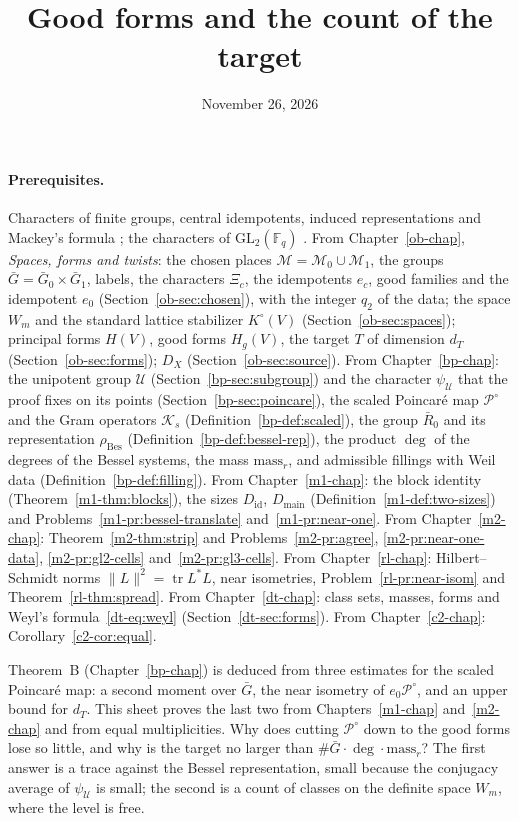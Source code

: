 \documentclass[reqno]{amsart}
\title{Good forms and the count of the target}
\author{}
\date{November 26, 2026}
\newcounter{chap}
\theoremstyle{plain}
\theoremstyle{definition}
\theoremstyle{remark}
\newcommand{\F}{\mathbb{F}}
\newcommand{\Gb}{\bar G}
\newcommand{\Rb}{\bar R_0}
\newcommand{\Po}{{\mathcal P^\circ}}
\newcommand{\Kc}{\mathcal K}
\newcommand{\Uc}{\mathcal U}
\newcommand{\Mcal}{\mathcal M}
\newcommand{\rB}{\rho_{\mathrm{Bes}}}
\newcommand{\Did}{D_{\mathrm{id}}}
\newcommand{\Dmain}{D_{\mathrm{main}}}
\newcommand{\mass}{\mathrm{mass}_r}
\newcommand{\GL}{\mathrm{GL}}
\newcommand{\tr}{\operatorname{tr}}
\begin{document}
\maketitle
{}\label{chap}

\paragraph{Prerequisites.}
Characters of finite groups, central idempotents, induced representations and Mackey's formula \cite[\S\S2, 6, 7]{Se}; the characters of \(\GL_2(\F_q)\) \cite[\S5.2]{FH}.  From Chapter~\ref{ob-chap}, \emph{Spaces, forms and twists}: the chosen places \(\Mcal = \Mcal_0 \cup \Mcal_1\), the groups \(\Gb = \Gb_0 \times \Gb_1\), labels, the characters \(\Xi_c\), the idempotents \(e_c\), good families and the idempotent \(e_0\) (Section~\ref{ob-sec:chosen}), with the integer \(q_2\) of the data; the space \(W_m\) and the standard lattice stabilizer \(K^\circ(V)\) (Section~\ref{ob-sec:spaces}); principal forms \(H(V)\), good forms \(H_g(V)\), the target \(T\) of dimension \(d_T\) (Section~\ref{ob-sec:forms}); \(D_X\) (Section~\ref{ob-sec:source}).  From Chapter~\ref{bp-chap}: the unipotent group \(\Uc\) (Section~\ref{bp-sec:subgroup}) and the character \(\psi_{\Uc}\) that the proof fixes on its points (Section~\ref{bp-sec:poincare}), the scaled Poincar\'e map \(\Po\) and the Gram operators \(\Kc_s\) (Definition~\ref{bp-def:scaled}), the group \(\Rb\) and its representation \(\rB\) (Definition~\ref{bp-def:bessel-rep}), the product \(\deg\) of the degrees of the Bessel systems, the mass \(\mass\), and admissible fillings with Weil data (Definition~\ref{bp-def:filling}).  From Chapter~\ref{m1-chap}: the block identity (Theorem~\ref{m1-thm:blocks}), the sizes \(\Did\), \(\Dmain\) (Definition~\ref{m1-def:two-sizes}) and Problems~\ref{m1-pr:bessel-translate} and~\ref{m1-pr:near-one}.  From Chapter~\ref{m2-chap}: Theorem~\ref{m2-thm:strip} and Problems~\ref{m2-pr:agree}, \ref{m2-pr:near-one-data}, \ref{m2-pr:gl2-cells} and~\ref{m2-pr:gl3-cells}.  From Chapter~\ref{rl-chap}: Hilbert--Schmidt norms \(\lVert L\rVert^2 = \tr L^*L\), near isometries, Problem~\ref{rl-pr:near-isom} and Theorem~\ref{rl-thm:spread}.  From Chapter~\ref{dt-chap}: class sets, masses, forms and Weyl's formula~\eqref{dt-eq:weyl} (Section~\ref{dt-sec:forms}).  From Chapter~\ref{c2-chap}: Corollary~\ref{c2-cor:equal}.

\medskip
Theorem~B (Chapter~\ref{bp-chap}) is deduced from three estimates for the scaled Poincar\'e map: a second moment over \(\Gb\), the near isometry of \(e_0\Po\), and an upper bound for \(d_T\).  This sheet proves the last two from Chapters~\ref{m1-chap} and~\ref{m2-chap} and from equal multiplicities.  Why does cutting \(\Po\) down to the good forms lose so little, and why is the target no larger than \(\#\Gb\cdot\deg\cdot\mass\)?  The first answer is a trace against the Bessel representation, small because the conjugacy average of \(\psi_{\Uc}\) is small; the second is a count of classes on the definite space \(W_m\), where the level is free.
\end{document}
